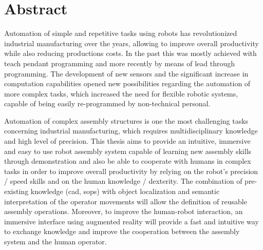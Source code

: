 \chapter*{Abstract}

Automation of simple and repetitive tasks using robots has revolutionized industrial manufacturing over the years, allowing to improve overall productivity while also reducing productions costs. In the past this was mostly achieved with teach pendant programming and more recently by means of lead through programming. The development of new sensors and the significant increase in computation capabilities opened new possibilities regarding the automation of more complex tasks, which increased the need for flexible robotic systems, capable of being easily re-programmed by non-technical personal.

Automation of complex assembly structures is one the most challenging tasks concerning industrial manufacturing, which requires multidisciplinary knowledge and high level of precision. This thesis aims to provide an intuitive, immersive and easy to use robot assembly system capable of learning new assembly skills through demonstration and also be able to cooperate with humans in complex tasks in order to improve overall productivity by relying on the robot's precision / speed skills and on the human knowledge / dexterity. The combination of pre-existing knowledge (\gls{cad}, \glspl{sop}) with object localization and semantic interpretation of the operator movements will allow the definition of reusable assembly operations. Moreover, to improve the human-robot interaction, an immersive interface using augmented reality will provide a fast and intuitive way to exchange knowledge and improve the cooperation between the assembly system and the human operator.
